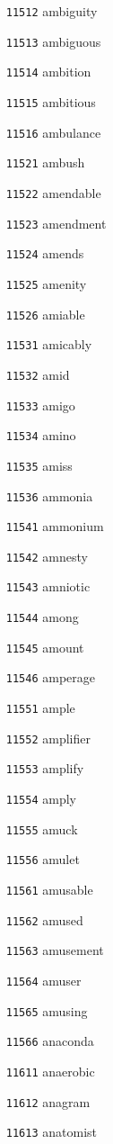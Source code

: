 \documentclass[twoside,11pt]{article}
\begin{document}
\begin{multicols}{5}
\begin{enumerate}
\item[\texttt{11512}] ambiguity
\item[\texttt{11513}] ambiguous
\item[\texttt{11514}] ambition
\item[\texttt{11515}] ambitious
\item[\texttt{11516}] ambulance
\item[\texttt{11521}] ambush
\item[\texttt{11522}] amendable
\item[\texttt{11523}] amendment
\item[\texttt{11524}] amends
\item[\texttt{11525}] amenity
\item[\texttt{11526}] amiable
\item[\texttt{11531}] amicably
\item[\texttt{11532}] amid
\item[\texttt{11533}] amigo
\item[\texttt{11534}] amino
\item[\texttt{11535}] amiss
\item[\texttt{11536}] ammonia
\item[\texttt{11541}] ammonium
\item[\texttt{11542}] amnesty
\item[\texttt{11543}] amniotic
\item[\texttt{11544}] among
\item[\texttt{11545}] amount
\item[\texttt{11546}] amperage
\item[\texttt{11551}] ample
\item[\texttt{11552}] amplifier
\item[\texttt{11553}] amplify
\item[\texttt{11554}] amply
\item[\texttt{11555}] amuck
\item[\texttt{11556}] amulet
\item[\texttt{11561}] amusable
\item[\texttt{11562}] amused
\item[\texttt{11563}] amusement
\item[\texttt{11564}] amuser
\item[\texttt{11565}] amusing
\item[\texttt{11566}] anaconda
\item[\texttt{11611}] anaerobic
\item[\texttt{11612}] anagram
\item[\texttt{11613}] anatomist

\end{enumerate}
\end{multicols}
\end{document}
